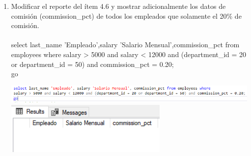 \begin{enumerate}[1.]
	\item Modificar el reporte del ítem 4.6 y mostrar adicionalmente los datos de comisión (commission\_pct) de todos los empleados que solamente el 20\% de comisi\'on.
	\\ \\select last\_name 'Empleado',salary 'Salario Mensual',commission\_pct from employees where salary > 5000 and salary < 12000 and (department\_id = 20 or department\_id = 50) and commission\_pct = 0.20;
	\\go

	\begin{center}
	\includegraphics[width=17cm]{./Imagenes/actividad_04_15a} 
	\includegraphics[width=8cm]{./Imagenes/actividad_04_15} 
	\end{center}

\end{enumerate}

